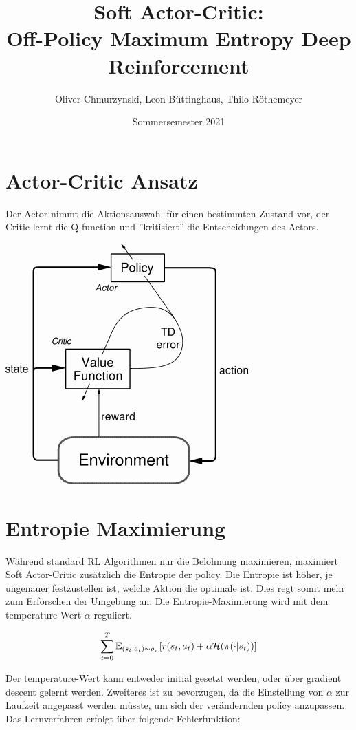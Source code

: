 \documentclass[8pt]{article}
\title{\vspace{-3cm}Soft Actor-Critic:\\
{\Large Off-Policy Maximum Entropy Deep Reinforcement}}
\author{{\normalsize Oliver Chmurzynski, Leon Büttinghaus, Thilo Röthemeyer}}
\date{{\normalsize Sommersemester 2021}}
\begin{document}
\maketitle
\thispagestyle{empty}

\begin{multicols}{2}

\section{Actor-Critic Ansatz}
Der Actor nimmt die Aktionsauswahl für einen bestimmten Zustand vor, der Critic lernt die Q-function und ''kritisiert'' die Entscheidungen des Actors.

\begin{center}\includegraphics[width=40ex]{figures/figtmp34.png}\end{center}

\section{Entropie Maximierung}
Während standard RL Algorithmen nur die Belohnung maximieren, maximiert Soft Actor-Critic zusätzlich die Entropie der policy. Die Entropie ist höher, je ungenauer festzustellen ist, welche Aktion die optimale ist. Dies regt somit mehr zum Erforschen der Umgebung an. Die Entropie-Maximierung wird mit dem temperature-Wert $\alpha$ reguliert.

\begin{equation}
	\sum_{t=0}^T \mathbb{E}_{(s_t,a_t)\sim\rho_\pi}[{\mathnormal{r}(s_t,a_t)} + \alpha \mathcal{H}(\pi(\cdot|s_t))]
\end{equation}

Der temperature-Wert kann entweder initial gesetzt werden, oder über gradient descent gelernt werden. Zweiteres ist zu bevorzugen, da die Einstellung von $\alpha$ zur Laufzeit angepasst werden müsste, um sich der verändernden policy anzupassen. Das Lernverfahren erfolgt über folgende Fehlerfunktion:


\end{multicols}
\end{document}

